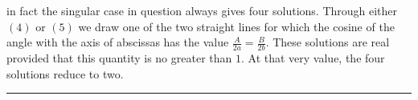 %
in fact the singular case in question always gives four solutions. Through either \((4)\) or \((5)\) we draw one of the two straight lines for which the cosine of the angle with the axis of abscissas has the value \(\frac A{2a}=\frac B{2b}\). These solutions are real provided that this quantity is no greater than \(1\). At that very value, the four solutions reduce to two.
\par\bigskip\begin{center}\rule{.16\textwidth}{.3pt}\end{center}
